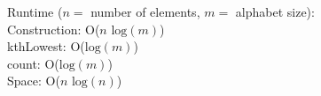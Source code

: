
Runtime ($n = $ number of elements, $m = $ alphabet size): \\
\indent Construction: O($n\text{ log}(m)$) \\
\indent kthLowest: O($\text{log}(m)$) \\
\indent count: O($\text{log}(m)$) \\
Space: O($n\text{ log}(n)$)



\newpage